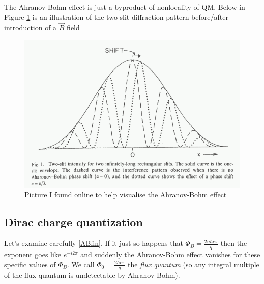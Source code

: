 \documentclass[12pt]{article}
\begin{document}
The Ahranov-Bohm effect is just a byproduct of nonlocality of QM. Below in Figure \ref{ABFig} is an illustration of the two-slit diffraction pattern before/after introduction of a $\vec{B}$ field
\begin{figure}[!h]
    \centering
    \includegraphics[scale=0.4]{Ph125c_AB.png}
    \caption{Picture I found online to help visualise the Ahranov-Bohm effect}
    \label{ABFig}
\end{figure}

\subsection*{Dirac charge quantization}

Let's examine carefully \eqref{ABfin}. If it just so happens that $\Phi_B = \frac{2n\hbar c\pi}{q}$ then the exponent goes like $e^{-i2\pi}$ and suddenly the Ahranov-Bohm effect vanishes for these specific values of $\Phi_B$. We call $\Phi_0 = \frac{2\hbar c\pi}{q}$ the \emph{flux quantum} (so any integral multiple of the flux quantum is undetectable by Ahranov-Bohm).
\end{document}
